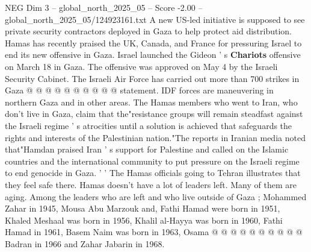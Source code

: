 \begin{textsample}{NEG Dim 3 – global\_north\_2025\_05 – Score -2.00 – global\_north\_2025\_05/124923161.txt}
A new US-led initiative is supposed to see private security contractors deployed in Gaza to help protect aid distribution.
Hamas has recently praised the UK, Canada, and France for pressuring Israel to end its new offensive in Gaza.
Israel launched the Gideon ' s \textbf{Chariots} offensive on March 18 in Gaza.
The offensive was approved on May 4 by the Israeli Security Cabinet.
The Israeli Air Force has carried out more than 700 strikes in Gaza @ @ @ @ @ @ @ @ @ @ statement.
IDF forces are maneuvering in northern Gaza and in other areas.
The Hamas members who went to Iran, who don't live in Gaza, claim that the"resistance groups will remain steadfast against the Israeli regime ' s atrocities until a solution is achieved that safeguards the rights and interests of the Palestinian nation."The reports in Iranian media noted that"Hamdan praised Iran ' s support for Palestine and called on the Islamic countries and the international community to put pressure on the Israeli regime to end genocide in Gaza. ' ' The Hamas officials going to Tehran illustrates that they feel safe there.
Hamas doesn't have a lot of leaders left.
Many of them are aging.
Among the leaders who are left and who live outside of Gaza ; Mohammed Zahar in 1945, Mousa Abu Marzouk and, Fathi Hamad were born in 1951, Khaled Meshaal was born in 1956, Khalil al-Hayya was born in 1960, Fathi Hamad in 1961, Basem Naim was born in 1963, Osama @ @ @ @ @ @ @ @ @ @ Badran in 1966 and Zahar Jabarin in 1968.

\end{textsample}
